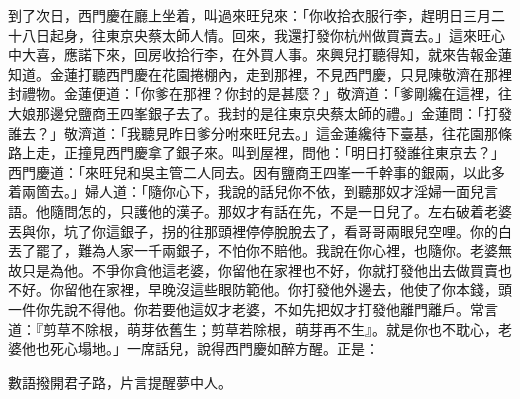 到了次日，西門慶在廳上坐着，叫過來旺兒來：「你收拾衣服行李，趕明日三月二十八日起身，往東京央蔡太師人情。回來，我還打發你杭州做買賣去。」這來旺心中大喜，{}應諾下來，回房收拾行李，在外買人事。來興兒打聽得知，就來告報金蓮知道。金蓮打聽西門慶在花園捲棚內，走到那裡，不見西門慶，只見陳敬濟在那裡封禮物。金蓮便道：「你爹在那裡？你封的是甚麼？」敬濟道：「爹剛纔在這裡，往大娘那邊兌鹽商王四峯銀子去了。我封的是往東京央蔡太師的禮。」金蓮問：「打發誰去？」敬濟道：「我聽見昨日爹分咐來旺兒去。」這金蓮纔待下臺基，往花園那條路上走，正撞見西門慶拿了銀子來。叫到屋裡，問他：「明日打發誰往東京去？」西門慶道：「來旺兒和吳主管二人同去。因有鹽商王四峯一千幹事的銀兩，以此多着兩箇去。」婦人道：「隨你心下，我說的話兒你不依，到聽那奴才淫婦一面兒言語。他隨問怎的，只護他的漢子。那奴才有話在先，不是一日兒了。左右破着老婆丟與你，坑了你這銀子，拐的往那頭裡停停脫脫去了，看哥哥兩眼兒空哩。你的白丟了罷了，難為人家一千兩銀子，不怕你不賠他。{}我說在你心裡，也隨你。老婆無故只是為他。不爭你貪他這老婆，你留他在家裡也不好，你就打發他出去做買賣也不好。你留他在家裡，早晚沒這些眼防範他。你打發他外邊去，他使了你本錢，頭一件你先說不得他。你若要他這奴才老婆，不如先把奴才打發他離門離戶。常言道：『剪草不除根，萌芽依舊生；剪草若除根，萌芽再不生』。就是你也不耽心，老婆他也死心塌地。」{}一席話兒，說得西門慶如醉方醒。正是：

\begin{myquote}
數語撥開君子路，片言提醒夢中人。
\end{myquote}

